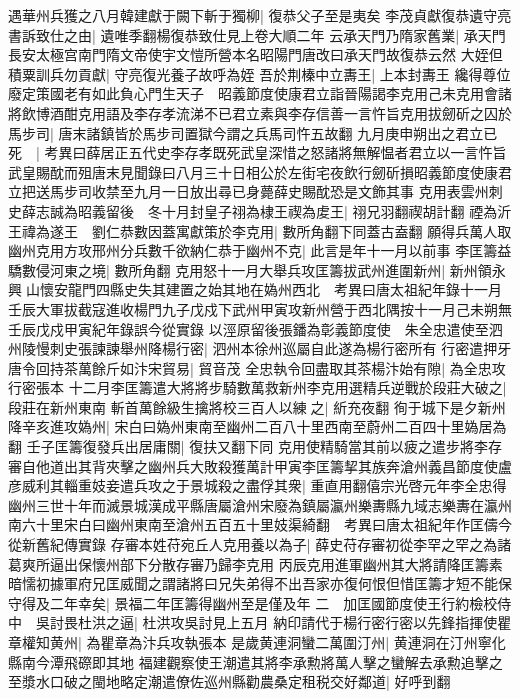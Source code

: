 遇華州兵獲之八月韓建獻于闕下斬于獨柳|{
	復恭父子至是夷矣}
李茂貞獻復恭遺守亮書訴致仕之由|{
	遺唯季翻楊復恭致仕見上卷大順二年}
云承天門乃隋家舊業|{
	承天門長安太極宫南門隋文帝使宇文愷所營本名昭陽門唐改曰承天門故復恭云然}
大姪但積粟訓兵勿貢獻|{
	守亮復光養子故呼為姪}
吾於荆榛中立夀王|{
	上本封夀王}
纔得尊位廢定策國老有如此負心門生天子　昭義節度使康君立詣晉陽謁李克用己未克用會諸將飲博酒酣克用語及李存孝流涕不已君立素與李存信善一言忤旨克用拔劒斫之囚於馬步司|{
	唐末諸鎮皆於馬步司置獄今謂之兵馬司忤五故翻}
九月庚申朔出之君立已死　|{
	考異曰薛居正五代史李存孝既死武皇深惜之怒諸將無解愠者君立以一言忤旨武皇賜酖而殂唐末見聞錄曰八月三十日相公於左街宅夜飲行劒斫損昭義節度使康君立把送馬步司收禁至九月一日放出尋已身薨薛史賜酖恐是文飾其事}
克用表雲州刺史薛志誠為昭義留後　冬十月封皇子祤為棣王禊為䖍王|{
	祤兄羽翻禊胡計翻}
禋為沂王禕為遂王　劉仁恭數因蓋寓獻策於李克用|{
	數所角翻下同蓋古盍翻}
願得兵萬人取幽州克用方攻邢州分兵數千欲納仁恭于幽州不克|{
	此言是年十一月以前事}
李匡籌益驕數侵河東之境|{
	數所角翻}
克用怒十一月大舉兵攻匡籌拔武州進圍新州|{
	新州領永興山懷安龍門四縣史失其建置之始其地在媯州西北　考異曰唐太祖紀年錄十一月壬辰大軍拔截寇進收楊門九子戊戍下武州甲寅攻新州營于西北隅按十一月己未朔無壬辰戊戍甲寅紀年錄誤今從實錄}
以涇原留後張鐇為彰義節度使　朱全忠遣使至泗州陵慢刺史張諫諫舉州降楊行密|{
	泗州本徐州巡屬自此遂為楊行密所有}
行密遣押牙唐令回持茶萬餘斤如汴宋貿易|{
	貿音茂}
全忠執令回盡取其茶楊汴始有隙|{
	為全忠攻行密張本}
十二月李匡籌遣大將將步騎數萬救新州李克用選精兵逆戰於段莊大破之|{
	段莊在新州東南}
斬首萬餘級生擒將校三百人以練之|{
	紤充夜翻}
徇于城下是夕新州降辛亥進攻媯州|{
	宋白曰媯州東南至幽州二百八十里西南至蔚州二百四十里媯居為翻}
壬子匡籌復發兵出居庸關|{
	復扶又翻下同}
克用使精騎當其前以疲之遣步將李存審自他道出其背夾擊之幽州兵大敗殺獲萬計甲寅李匡籌挈其族奔滄州義昌節度使盧彦威利其輜重妓妾遣兵攻之于景城殺之盡俘其衆|{
	重直用翻僖宗光啓元年李全忠得幽州三世十年而滅景城漢成平縣唐屬滄州宋廢為鎮屬瀛州樂夀縣九域志樂夀在瀛州南六十里宋白曰幽州東南至滄州五百五十里妓渠綺翻　考異曰唐太祖紀年作匡儔今從新舊紀傳實錄}
存審本姓苻宛丘人克用養以為子|{
	薛史苻存審初從李罕之罕之為諸葛爽所逼出保懷州部下分散存審乃歸李克用}
丙辰克用進軍幽州其大將請降匡籌素暗懦初據軍府兄匡威聞之謂諸將曰兄失弟得不出吾家亦復何恨但惜匡籌才短不能保守得及二年幸矣|{
	景福二年匡籌得幽州至是僅及年}
二　加匡國節度使王行約檢校侍中　吳討畏杜洪之逼|{
	杜洪攻吳討見上五月}
納印請代于楊行密行密以先鋒指揮使瞿章權知黄州|{
	為瞿章為汴兵攻執張本}
是歲黄連洞蠻二萬圍汀州|{
	黄連洞在汀州寧化縣南今潭飛磜即其地}
福建觀察使王潮遣其將李承勲將萬人擊之蠻解去承勲追擊之至漿水口破之閩地略定潮遣僚佐巡州縣勸農桑定租税交好鄰道|{
	好呼到翻}
